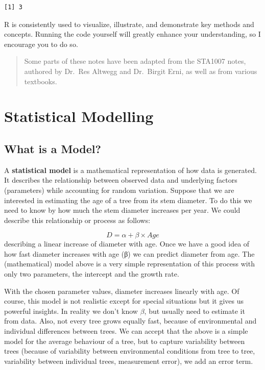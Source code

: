 \documentclass[
  letterpaper,
]{book}
\begin{document}
\begin{verbatim}
[1] 3
\end{verbatim}

R is consistently used to visualize, illustrate, and demonstrate key
methods and concepts. Running the code yourself will greatly enhance
your understanding, so I encourage you to do so.

\begin{quote}
Some parts of these notes have been adapted from the STA1007 notes,
authored by Dr.~Res Altwegg and Dr.~Birgit Erni, as well as from various
textbooks.
\end{quote}


\chapter*{Statistical Modelling}\label{statistical-modelling}


\section*{What is a Model?}\label{what-is-a-model}


A \textbf{statistical model} is a mathematical representation of how
data is generated. It describes the relationship between observed data
and underlying factors (parameters) while accounting for random
variation. Suppose that we are interested in estimating the age of a
tree from its stem diameter. To do this we need to know by how much the
stem diameter increases per year. We could describe this relationship or
process as follows:

\[D = \alpha + \beta \times Age\] describing a linear increase of
diameter with age. Once we have a good idea of how fast diameter
increases with age (β) we can predict diameter from age. The
(mathematical) model above is a very simple representation of this
process with only two parameters, the intercept and the growth rate.

With the chosen parameter values, diameter increases linearly with age.
Of course, this model is not realistic except for special situations but
it gives us powerful insights. In reality we don't know \(\beta\), but
usually need to estimate it from data. Also, not every tree grows
equally fast, because of environmental and individual differences
between trees. We can accept that the above is a simple model for the
average behaviour of a tree, but to capture variability between trees
(because of variability between environmental conditions from tree to
tree, variability between individual trees, measurement error), we add
an error term.
\end{document}
